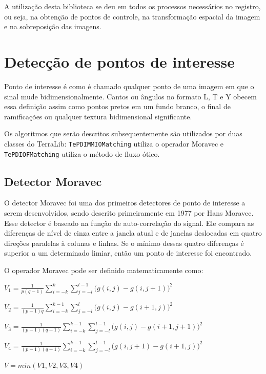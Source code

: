 \documentclass[9pt, a4paper, nofonttune, journal]{IEEEtran}
\begin{document}
A utilização desta biblioteca se deu em todos os processos necessários no registro, ou seja, na obtenção de pontos de controle,
na transformação espacial da imagem e na sobreposição das imagens.


\section{Detecção de pontos de interesse}
Ponto de interesse é como é chamado qualquer ponto de uma imagem em que o sinal mude bidimensionalmente. Cantos ou ângulos
no formato L, T e Y obecem essa definição assim como pontos pretos em um fundo branco, o final de ramificações ou qualquer textura bidimensional
significante.\cite{Coderlia1}

Os algoritmos que serão descritos subsequentemente são utilizados por duas classes do TerraLib:
\texttt{TePDIMMIOMatching} utiliza o operador Moravec e \texttt{TePDIOFMatching} utiliza o método de fluxo ótico.
\subsection{Detector Moravec}
O detector Moravec foi uma dos primeiros detectores de ponto de interesse a serem desenvolvidos, sendo descrito primeiramente 
em 1977 por Hans Moravec.\cite{Moravec1}
Esse detector é baseado na função de auto-correlação do signal. Ele compara as diferenças de nível de cinza entre a janela atual e de janelas 
deslocadas em quatro direções paralelas à colunas e linhas. Se o mínimo dessas quatro diferenças é superior a um determinado limiar, então um ponto de interesse
foi encontrado.\cite{Coderlia1}
  
O operador Moravec pode ser definido matematicamente como:
    \begin{center}$V_{1}=\frac{1}{p(q-1)}\sum_{i=-k}^k\sum_{j=-l}^{l-1}\bigl(g(i,j)-g(i,j+1)\bigr)^2$    \end{center}
    \begin{center}$V_{2}=\frac{1}{(p-1)q}\sum_{i=-k}^{k-1}\sum_{j=-l}^l\bigl(g(i,j)-g(i+1,j)\bigr)^2$    \end{center}
    \begin{center}$V_{3}=\frac{1}{(p-1)(q-1)}\sum_{i=-k}^{k-1}\sum_{j=-l}^{l-1}\bigl(g(i,j)-g(i+1,j+1)\bigr)^2$\end{center}
    \begin{center}$V_{4}=\frac{1}{(p-1)(q-1)}\sum_{i=-k}^{k-1}\sum_{j=-l}^{l-1}\bigl(g(i,j+1)-g(i+1,j)\bigr)^2$\end{center}
    \begin{center}$V = min(V1,V2,V3,V4)$\end{center}
\end{document}
